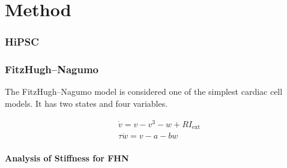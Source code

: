 \chapter{Method}
\label{sec:method}


\subsection{HiPSC}




\subsection{FitzHugh–Nagumo}

The FitzHugh–Nagumo model is considered one of the simplest cardiac cell models. It has two states and four variables.

\begin{align}\label{eq:fhn} %
	&\dot{v}=v-v^{3}-w+R I_{\mathrm{ext}} \\
	&\tau \dot{w}=v-a-b w
\end{align}



\subsubsection{Analysis of Stiffness for FHN}


